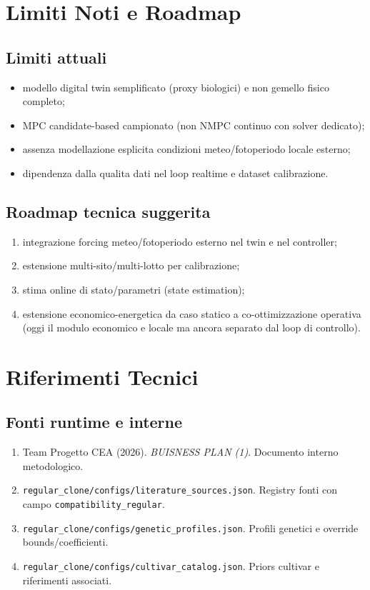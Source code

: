 ﻿\documentclass[11pt,a4paper]{report}
\begin{document}
\newpage
\chapter{Limiti Noti e Roadmap}

\section{Limiti attuali}
\begin{itemize}
  \item modello digital twin semplificato (proxy biologici) e non gemello fisico completo;
  \item MPC candidate-based campionato (non NMPC continuo con solver dedicato);
  \item assenza modellazione esplicita condizioni meteo/fotoperiodo locale esterno;
  \item dipendenza dalla qualita dati nel loop realtime e dataset calibrazione.
\end{itemize}

\section{Roadmap tecnica suggerita}
\begin{enumerate}
  \item integrazione forcing meteo/fotoperiodo esterno nel twin e nel controller;
  \item estensione multi-sito/multi-lotto per calibrazione;
  \item stima online di stato/parametri (state estimation);
  \item estensione economico-energetica da caso statico a co-ottimizzazione operativa (oggi il modulo economico e locale ma ancora separato dal loop di controllo).
\end{enumerate}

\newpage
\chapter{Riferimenti Tecnici}

\section{Fonti runtime e interne}
\begin{enumerate}
  \item Team Progetto CEA (2026). \emph{BUISNESS PLAN (1)}. Documento interno metodologico.
  \item \texttt{regular\_clone/configs/literature\_sources.json}. Registry fonti con campo \texttt{compatibility\_regular}.
  \item \texttt{regular\_clone/configs/genetic\_profiles.json}. Profili genetici e override bounds/coefficienti.
  \item \texttt{regular\_clone/configs/cultivar\_catalog.json}. Priors cultivar e riferimenti associati.
\end{enumerate}
\end{document}
